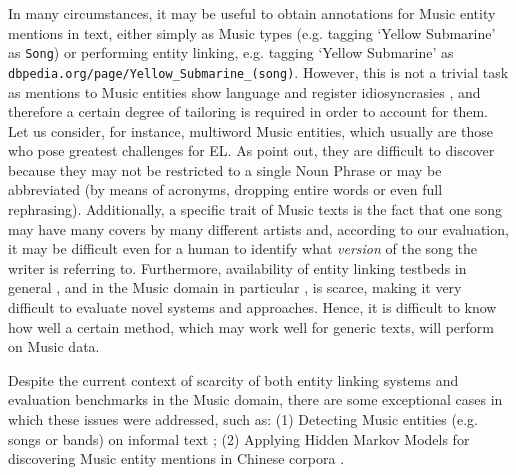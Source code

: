 In many circumstances, it may be useful to obtain annotations for Music entity mentions in text, either simply as Music types (e.g. tagging `Yellow Submarine' as \texttt{Song}) or performing entity linking, e.g. tagging `Yellow Submarine' as \texttt{dbpedia.org/page/Yellow\_Submarine\_(song)}. However, this is not a trivial task as mentions to Music entities show language and register idiosyncrasies \citep{Tata2010,Gruhl2009}, and therefore a certain degree of tailoring is required in order to account for them. Let us consider, for instance, multiword Music entities, which usually are those who pose greatest challenges for EL. As \cite{Tata2010} point out, they are difficult to discover because they may not be restricted to a single Noun Phrase or may be abbreviated (by means of acronyms, dropping entire words or even full rephrasing). Additionally, a specific trait of Music texts is the fact that one song may have many covers by many different artists and, according to our evaluation, it may be difficult even for a human to identify what \textit{version} of the song the writer is referring to. Furthermore, availability of entity linking testbeds in general \citep{Usbeck2015}, and in the Music domain in particular \citep{Gruhl2009}, is scarce, making it very difficult to evaluate novel systems and approaches. Hence, it is difficult to know how well a certain method, which may work well for generic texts, will perform on Music data.


Despite the current context of scarcity of both entity linking systems and evaluation benchmarks in the Music domain, there are some exceptional cases in which these issues were addressed, such as: (1) Detecting Music entities (e.g. songs or bands) on informal text \citep{Gruhl2009}; (2) Applying Hidden Markov Models for discovering Music entity mentions in Chinese corpora \citep{Zhang2009}.%


